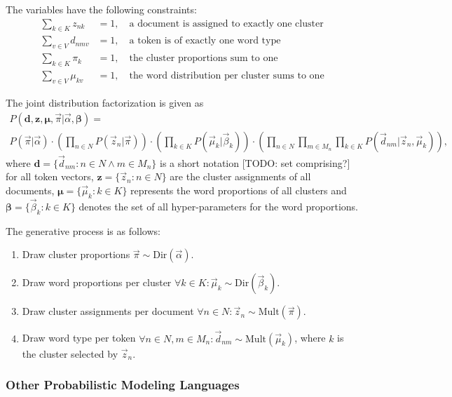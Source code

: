 \begin{Example}
The variables have the following constraints:
\begin{align}
\sum_{k \in K} z_{nk} &= 1,\quad \text{a document is assigned to exactly one cluster}\\
\sum_{v \in V} d_{nmv} &= 1,\quad \text{a token is of exactly one word type}\\
\sum_{k \in K} \pi_{k} &= 1,\quad \text{the cluster proportions sum to one}\\
\sum_{v \in V} \mu_{kv} &= 1,\quad \text{the word distribution per cluster sums to one}
\end{align}

The joint distribution factorization is given as
\begin{multline}
P(\boldsymbol{d},\boldsymbol{z}, \boldsymbol{\mu}, \vec \pi | \vec \alpha, \boldsymbol{\beta}) = \\
 P(\vec \pi | \vec \alpha) \cdot
 \left(\prod_{n \in N} P(\vec z_n | \vec \pi)\right) \cdot
 \left(\prod_{k \in K}P(\vec \mu_k | \vec \beta_k)\right) \cdot 
 \left(\prod_{n \in N} \prod_{m \in M_n} \prod_{k \in K}P(\vec d_{nm} | \vec z_n, \vec \mu_k)\right),
\end{multline}
where $\boldsymbol{d} = \{\vec d_{nm} : n \in N \land m \in M_n \}$ is a short notation [TODO: set comprising?] for all token vectors, $\boldsymbol{z} = \{ \vec z_n : n \in N \}$ are the cluster assignments of all documents, $\boldsymbol{\mu} = \{ \vec \mu_k : k \in K \}$ represents the word proportions of all clusters and $\boldsymbol{\beta} = \{ \vec \beta_k : k \in K \}$ denotes the set of all hyper-parameters for the word proportions.

The generative process is as follows:
\begin{enumerate}
\item Draw cluster proportions $\vec \pi \sim \text{Dir}(\vec \alpha)$.
\item Draw word proportions per cluster $\forall k \in K: \vec \mu_k \sim \text{Dir}(\vec \beta_k)$.
\item Draw cluster assignments per document $\forall n \in N: \vec z_n \sim \text{Mult}(\vec \pi)$.
\item Draw word type per token $\forall n \in N, m \in M_n: \vec d_{nm} \sim \text{Mult}(\vec \mu_k)$, where $k$ is the cluster selected by $\vec z_n$.
\end{enumerate}

\end{Example}

\subsubsection{Other Probabilistic Modeling Languages}

